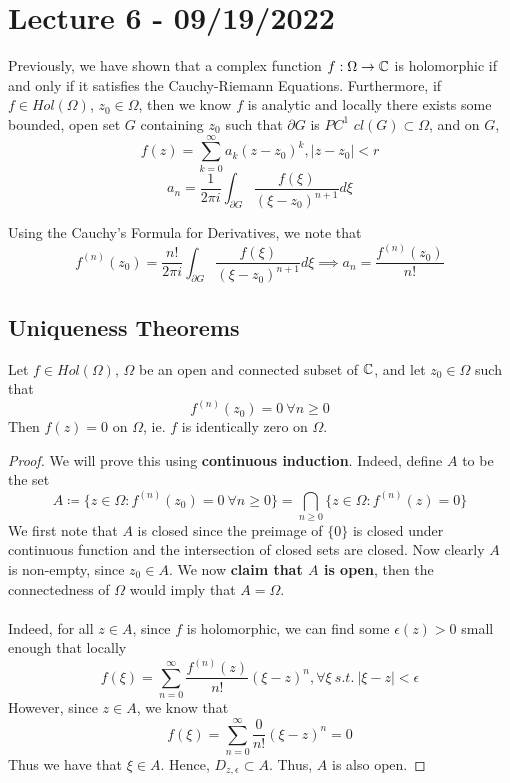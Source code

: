 \section{Lecture 6 - 09/19/2022}

Previously, we have shown that a complex function $f: \Omega \to \mathbb{C}$ is holomorphic if and only if it satisfies the Cauchy-Riemann Equations. Furthermore, if $f \in Hol(\Omega)$, $z_0 \in \Omega$, then we know $f$ is analytic and locally there exists some bounded, open set $G$ containing $z_0$ such that $\partial G$ is $PC^1$ $cl(G) \subset \Omega$, and on $G$,
\[f(z) = \sum_{k = 0}^\infty a_k (z - z_0)^k, |z - z_0| < r\]
\[a_n = \frac{1}{2 \pi i} \int_{\partial G} \frac{f(\xi)}{(\xi - z_0)^{n+1}} d\xi\]

\noindent Using the Cauchy's Formula for Derivatives, we note that
\[f^{(n)}(z_0) = \frac{n!}{2 \pi i} \int_{\partial G} \frac{f(\xi)}{(\xi - z_0)^{n+1}} d\xi \implies a_n = \frac{f^{(n)}(z_0)}{n!}\]

\subsection{Uniqueness Theorems}

\begin{theorem}
Let $f \in Hol(\Omega)$, $\Omega$ be an open and connected subset of $\mathbb{C}$, and let $z_0 \in \Omega$ such that
\[f^{(n)}(z_0) = 0\ \forall n \geq 0\]
Then $f(z) = 0$ on $\Omega$, ie. $f$ is identically zero on $\Omega$.
\end{theorem}

\begin{proof}
We will prove this using \textbf{continuous induction}. Indeed, define $A$ to be the set
\[A \coloneqq \{z \in \Omega : f^{(n)}(z_0) = 0\ \forall n \geq 0\} = \bigcap_{n \geq 0} \{z \in \Omega: f^{(n)}(z) = 0\}\]
We first note that $A$ is closed since the preimage of $\{0\}$ is closed under continuous function and the intersection of closed sets are closed. Now clearly $A$ is non-empty, since $z_0 \in A$. We now \textbf{claim that $A$ is open}, then the connectedness of $\Omega$ would imply that $A = \Omega$.\\\\
Indeed, for all $z \in A$, since $f$ is holomorphic, we can find some $\epsilon(z) > 0$ small enough that locally
\[f(\xi) = \sum_{n = 0}^\infty \frac{f^{(n)}(z)}{n!}(\xi - z)^n, \forall \xi\ s.t.\ |\xi - z| < \epsilon\]
However, since $z \in A$, we know that
\[f(\xi) = \sum_{n = 0}^\infty \frac{0}{n!}(\xi - z)^n = 0\]
Thus we have that $\xi \in A$. Hence, $D_{z, \epsilon} \subset A$. Thus, $A$ is also open.
\end{proof}

